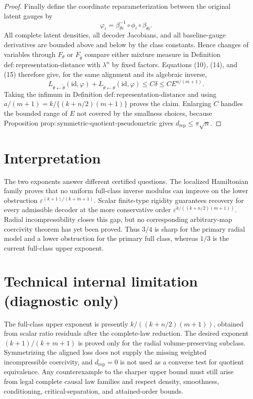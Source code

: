 \documentclass{article}
\begin{document}
\begin{proof}
Finally define the coordinate reparameterization between the original latent gauges by
\[
\varphi_i=\beta_{\theta i}^{-1}\circ\phi_i\circ\beta_{\widetilde\theta i}.
\tag{15}
\]
All complete latent densities, all decoder Jacobians, and all baseline-gauge derivatives are bounded above and below by the class constants.  Hence changes of variables through \(F_\theta\) or \(F_{\widetilde\theta}\) compare either mixture measure in Definition \(\mathrm{def:representation\text{-}distance}\) with \(\lambda^n\) by fixed factors.  Equations (10), (14), and (15) therefore give, for the same alignment and its algebraic inverse,
\[
L_{\theta\leftarrow\widetilde\theta}(\mathrm{id},\varphi)
+L_{\widetilde\theta\leftarrow\theta}(\mathrm{id},\varphi)
\leq C\delta
\leq C E^{a/(m+1)}.
\]
Taking the infimum in Definition \(\mathrm{def:representation\text{-}distance}\) and using \(a/(m+1)=k/\{(k+n/2)(m+1)\}\) proves the claim.  Enlarging \(C\) handles the bounded range of \(E\) not covered by the smallness choices, because Proposition \(\mathrm{prop:symmetric\text{-}quotient\text{-}pseudometric}\) gives \(d_{\mathrm{rep}}\leq\pi\sqrt n\).
\end{proof}

\section{Interpretation}

The two exponents answer different certified questions. The localized Hamiltonian family proves that no uniform full-class inverse modulus can improve on the lower obstruction \(\varepsilon^{(k+1)/(k+m+1)}\). Scalar finite-type rigidity guarantees recovery for every admissible decoder at the more conservative order \(\varepsilon^{k/((k+n/2)(m+1))}\). Radial incompressibility closes this gap, but no corresponding arbitrary-map coercivity theorem has yet been proved. Thus \(3/4\) is sharp for the primary radial model and a lower obstruction for the primary full class, whereas \(1/3\) is the current full-class upper exponent.

\section*{Technical internal limitation (diagnostic only)}

The full-class upper exponent is presently \(k/((k+n/2)(m+1))\), obtained from scalar ratio residuals after the complete-law reduction. The desired exponent \((k+1)/(k+m+1)\) is proved only for the radial volume-preserving subclass. Symmetrizing the aligned loss does not supply the missing weighted incompressible coercivity, and \(d_{\mathrm{rep}}=0\) is not used as a converse test for quotient equivalence. Any counterexample to the sharper upper bound must still arise from legal complete causal law families and respect density, smoothness, conditioning, critical-separation, and attained-order bounds.
\end{document}

